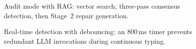 \begin{figure}[H]
  \centering
  \caption{Audit mode with RAG: vector search, three-pass consensus detection, then Stage~2 repair generation.}
  \label{fig:seq-audit-rag}
\end{figure}

\begin{figure}[H]
  \centering
  \caption{Real-time detection with debouncing: an 800\,ms timer prevents redundant LLM invocations during continuous typing.}
  \label{fig:seq-realtime-debounced}
\end{figure}
